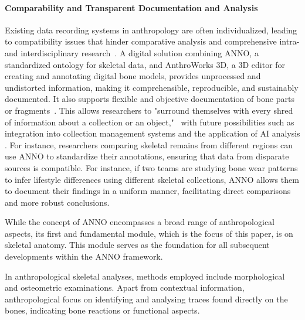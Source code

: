 \documentclass[sw]{iosart2x}
\begin{document}
\paragraph{Comparability and Transparent Documentation and Analysis}\label{sec:comp+transp} 
Existing data recording systems in anthropology are often individualized, leading to compatibility issues that hinder comparative analysis and comprehensive intra- and interdisciplinary research~\cite{HeuschkelSchmiedelLabudde2024}.
A digital solution combining ANNO, a standardized ontology for skeletal data, and AnthroWorks 3D, a 3D editor for creating and annotating digital bone models, provides unprocessed and undistorted information, making it comprehensible, reproducible, and sustainably documented.
It also supports flexible and objective documentation of bone parts or fragments~\cite{aw3dcidoc}.
This allows researchers to "surround themselves with every shred of information about a collection or an object,"~\cite[p.~148]{Palkovich.2001} with future possibilities such as integration into collection management systems and the application of AI analysis \cite{HeuschkelSchmiedelLabudde2024}. 
For instance, researchers comparing skeletal remains from different regions can use ANNO to standardize their annotations, ensuring that data from disparate sources is compatible.
For instance, if two teams are studying bone wear patterns to infer lifestyle differences using different skeletal collections, ANNO allows them to document their findings in a uniform manner, facilitating direct comparisons and more robust conclusions.

While the concept of ANNO encompasses a broad range of anthropological aspects, its first and fundamental module, which is the focus of this paper, is on skeletal anatomy.
This module serves as the foundation for all subsequent developments within the ANNO framework.

In anthropological skeletal analyses, methods employed include morphological and osteometric examinations.
Apart from contextual information, anthropological focus on identifying and analysing traces found directly on the bones, indicating bone reactions or functional aspects.
\end{document}
